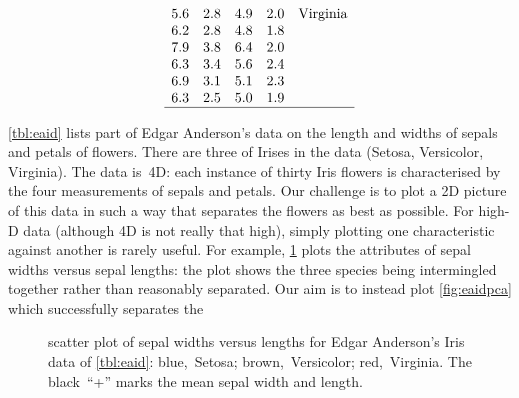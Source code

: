 \begin{example}
\begin{table}
\begin{equation*}
\begin{array}{rrrrl}
\\5.6&2.8&4.9&2.0&\text{Virginia}
\\6.2&2.8&4.8&1.8&
\\7.9&3.8&6.4&2.0&
\\6.3&3.4&5.6&2.4&
\\6.9&3.1&5.1&2.3&
\\6.3&2.5&5.0&1.9&
\\\hline
\end{array}
\end{equation*}
\end{table}
\cref{tbl:eaid} lists part of Edgar Anderson's data on the length and widths of sepals and petals of  flowers.
There are three  of Irises in the data (Setosa, Versicolor, Virginia).
The data is~4D: each instance of thirty Iris flowers is characterised by the four measurements of sepals and petals.
Our challenge is to plot a 2D picture of this data in such a way that separates the flowers as best as possible.
For high-D data (although 4D is not really that high), simply plotting one characteristic against another is rarely useful.
For example,  \cref{fig:eaid} plots the attributes of sepal widths versus sepal lengths: the plot shows the three species being intermingled together rather than reasonably separated.
Our aim is to instead plot \cref{fig:eaidpca} which successfully separates the 

\begin{figure}
\centering
{}
\caption{scatter plot of sepal widths versus lengths for Edgar Anderson's Iris data of \cref{tbl:eaid}: blue,~Setosa; brown,~Versicolor; red,~Virginia.  
The black~``+'' marks the mean sepal width and length.}
\label{fig:eaid}
\end{figure}


\end{example}
